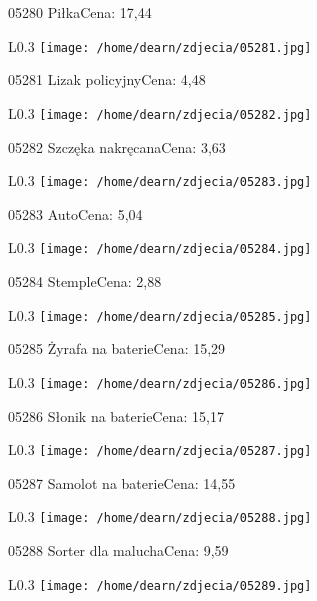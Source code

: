 05280 PiłkaCena: 17,44\newline
\begin{wrapfigure}{L}{0.3\textwidth}
\texttt{[image: /home/dearn/zdjecia/05281.jpg]}
\end{wrapfigure}
05281 Lizak policyjnyCena: 4,48\newline
\begin{wrapfigure}{L}{0.3\textwidth}
\texttt{[image: /home/dearn/zdjecia/05282.jpg]}
\end{wrapfigure}
05282 Szczęka nakręcanaCena: 3,63\newline
\begin{wrapfigure}{L}{0.3\textwidth}
\texttt{[image: /home/dearn/zdjecia/05283.jpg]}
\end{wrapfigure}
05283 AutoCena: 5,04\newline
\begin{wrapfigure}{L}{0.3\textwidth}
\texttt{[image: /home/dearn/zdjecia/05284.jpg]}
\end{wrapfigure}
05284 StempleCena: 2,88\newline
\begin{wrapfigure}{L}{0.3\textwidth}
\texttt{[image: /home/dearn/zdjecia/05285.jpg]}
\end{wrapfigure}
05285 Żyrafa na baterieCena: 15,29\newline
\begin{wrapfigure}{L}{0.3\textwidth}
\texttt{[image: /home/dearn/zdjecia/05286.jpg]}
\end{wrapfigure}
05286 Słonik na baterieCena: 15,17\newline
\begin{wrapfigure}{L}{0.3\textwidth}
\texttt{[image: /home/dearn/zdjecia/05287.jpg]}
\end{wrapfigure}
05287 Samolot na baterieCena: 14,55\newline
\begin{wrapfigure}{L}{0.3\textwidth}
\texttt{[image: /home/dearn/zdjecia/05288.jpg]}
\end{wrapfigure}
05288 Sorter dla maluchaCena: 9,59\newline
\begin{wrapfigure}{L}{0.3\textwidth}
\texttt{[image: /home/dearn/zdjecia/05289.jpg]}
\end{wrapfigure}
